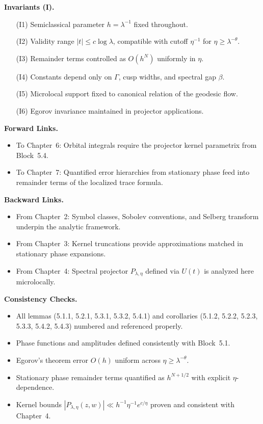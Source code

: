\medskip

\noindent\textbf{Invariants (I).}
\begin{itemize}
  \item[(I1)] Semiclassical parameter $h=\lambda^{-1}$ fixed throughout.
  \item[(I2)] Validity range $|t|\le c\log \lambda$, compatible with cutoff $\eta^{-1}$ for $\eta \ge \lambda^{-\theta}$.
  \item[(I3)] Remainder terms controlled as $O(h^N)$ uniformly in $\eta$.
  \item[(I4)] Constants depend only on $\Gamma$, cusp widths, and spectral gap $\beta$.
  \item[(I5)] Microlocal support fixed to canonical relation of the geodesic flow.
  \item[(I6)] Egorov invariance maintained in projector applications.
\end{itemize}

\medskip

\noindent\textbf{Forward Links.}
\begin{itemize}
  \item To Chapter~6: Orbital integrals require the projector kernel parametrix from Block~5.4.
  \item To Chapter~7: Quantified error hierarchies from stationary phase feed into remainder terms of the localized trace formula.
\end{itemize}

\medskip

\noindent\textbf{Backward Links.}
\begin{itemize}
  \item From Chapter~2: Symbol classes, Sobolev conventions, and Selberg transform underpin the analytic framework.
  \item From Chapter~3: Kernel truncations provide approximations matched in stationary phase expansions.
  \item From Chapter~4: Spectral projector $P_{\lambda,\eta}$ defined via $U(t)$ is analyzed here microlocally.
\end{itemize}

\medskip

\noindent\textbf{Consistency Checks.}
\begin{itemize}
  \item All lemmas (5.1.1, 5.2.1, 5.3.1, 5.3.2, 5.4.1) and corollaries (5.1.2, 5.2.2, 5.2.3, 5.3.3, 5.4.2, 5.4.3) numbered and referenced properly.
  \item Phase functions and amplitudes defined consistently with Block~5.1.
  \item Egorov’s theorem error $O(h)$ uniform across $\eta \ge \lambda^{-\theta}$.
  \item Stationary phase remainder terms quantified as $h^{N+1/2}$ with explicit $\eta$-dependence.
  \item Kernel bounds $|P_{\lambda,\eta}(z,w)| \ll h^{-1}\eta^{-1}e^{c/\eta}$ proven and consistent with Chapter~4.
\end{itemize}

